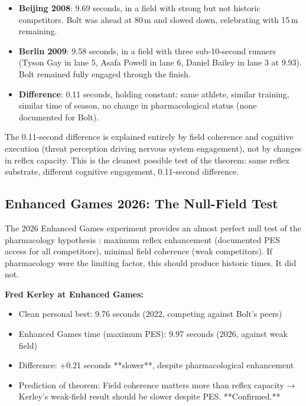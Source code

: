 \documentclass[11pt,twocolumn]{article}
\theoremstyle{definition}
\theoremstyle{remark}
\begin{document}
\begin{itemize}[leftmargin=1.2em]
\item \textbf{Beijing 2008}: 9.69 seconds, in a field with strong but not historic competitors. Bolt was ahead at 80\,m and slowed down, celebrating with 15\,m remaining.

\item \textbf{Berlin 2009}: 9.58 seconds, in a field with three sub-10-second runners (Tyson Gay in lane 5, Asafa Powell in lane 6, Daniel Bailey in lane 3 at 9.93). Bolt remained fully engaged through the finish.

\item \textbf{Difference}: 0.11 seconds, holding constant: same athlete, similar training, similar time of season, no change in pharmacological status (none documented for Bolt).
\end{itemize}

The 0.11-second difference is explained entirely by field coherence and cognitive execution (threat perception driving nervous system engagement), not by changes in reflex capacity. This is the cleanest possible test of the theorem: same reflex substrate, different cognitive engagement, 0.11-second difference.

\subsection{Enhanced Games 2026: The Null-Field Test}

The 2026 Enhanced Games experiment provides an almost perfect null test of the pharmacology hypothesis \cite{enhanced2026official}: maximum reflex enhancement (documented PES access for all competitors), minimal field coherence (weak competitors). If pharmacology were the limiting factor, this should produce historic times. It did not.

\textbf{Fred Kerley at Enhanced Games:}
\begin{itemize}[leftmargin=1.2em]
\item Clean personal best: 9.76 seconds (2022, competing against Bolt's peers)
\item Enhanced Games time (maximum PES): 9.97 seconds (2026, against weak field)
\item Difference: +0.21 seconds **slower**, despite pharmacological enhancement
\item Prediction of theorem: Field coherence matters more than reflex capacity → Kerley's weak-field result should be slower despite PES. **Confirmed.**
\end{itemize}
\end{document}
